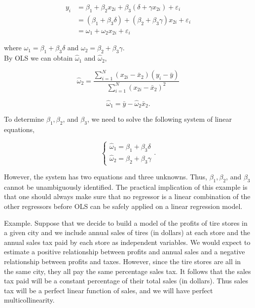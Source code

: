 $$
\begin{aligned}
y_{i} & =\beta_{1}+\beta_{2} x_{2 i}+\beta_{3}\left(\delta+\gamma x_{2 i}\right)+\varepsilon_{i} \\
& =\left(\beta_{1}+\beta_{3} \delta\right)+\left(\beta_{2}+\beta_{3} \gamma\right) x_{2 i}+\varepsilon_{i} \\
& =\omega_{1}+\omega_{2} x_{2 i}+\varepsilon_{i}
\end{aligned}
$$

where $\omega_{1}=\beta_{1}+\beta_{3} \delta$ and $\omega_{2}=\beta_{2}+\beta_{3} \gamma$.\\
By OLS we can obtain $\widehat{\omega}_{1}$ and $\widehat{\omega}_{2}$,

$$
\widehat{\omega}_{2}=\frac{\sum_{i=1}^{N}\left(x_{2 i}-\bar{x}_{2}\right)\left(y_{i}-\bar{y}\right)}{\sum_{i=1}^{N}\left(x_{2 i}-\bar{x}_{2}\right)^{2}}
$$

$$
\widehat{\omega}_{1}=\bar{y}-\widehat{\omega}_{2} \bar{x}_{2} .
$$

To determine $\beta_{1}, \beta_{2}$, and $\beta_{3}$, we need to solve the following system of linear equations,

$$
\left\{\begin{array}{l}
\widehat{\omega}_{1}=\beta_{1}+\beta_{3} \delta \\
\widehat{\omega}_{2}=\beta_{2}+\beta_{3} \gamma
\end{array} .\right.
$$

However, the system has two equations and three unknowns. Thus, $\beta_{1}, \beta_{2}$, and $\beta_{3}$ cannot be unambiguously identified. The practical implication of this example is that one should always make sure that no regressor is a linear combination of the other regressors before OLS can be safely applied on a linear regression model.

Example. Suppose that we decide to build a model of the profits of tire stores in a given city and we include annual sales of tires (in dollars) at each store and the annual sales tax paid by each store as independent variables. We would expect to estimate a positive relationship between profits and annual sales and a negative relationship between profits and taxes. However, since the tire stores are all in the same city, they all pay the same percentage sales tax. It follows that the sales tax paid will be a constant percentage of their total sales (in dollars). Thus sales tax will be a perfect linear function of sales, and we will have perfect multicollinearity.